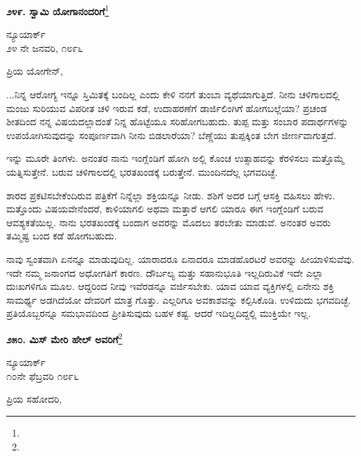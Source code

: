 \begin{center}
\textbf{೨೪೯. ಸ್ವಾಮಿ ಯೋಗಾನಂದರಿಗೆ}\footnote{}
\end{center}

\vspace{-0.5cm}

\begin{flushright}
ನ್ಯೂಯಾರ್ಕ್\\೨೪ ನೇ ಜನವರಿ, ೧೮೯೬
\end{flushright}

\vspace{-0.5cm}

\noindent
ಪ್ರಿಯ ಯೋಗೇನ್,

...ನಿನ್ನ ಆರೋಗ್ಯ ಇನ್ನೂ ಸ್ತಿಮಿತಕ್ಕೆ ಬಂದಿಲ್ಲ ಎಂದು ಕೇಳಿ ನನಗೆ ತುಂಬಾ ವ್ಯಥೆಯಾಗುತ್ತಿದೆ. ನೀನು ಚಳಿಗಾಲದಲ್ಲಿ ಮಂಜು ಸುರಿಯುವ ವಿಪರೀತ ಚಳಿ ಇರುವ ಕಡೆ, ಉದಾಹರಣೆಗೆ ಡಾರ್ಜಿಲಿಂಗಿಗೆ ಹೋಗಬಲ್ಲೆಯಾ? ಪ್ರಚಂಡ ಶೀತದಿಂದ ನನ್ನ ವಿಷಯದಲ್ಲಾದಂತೆ ನಿನ್ನ ಹೊಟ್ಟೆಯೂ ಸರಿಹೋಗಬಹುದು. ತುಪ್ಪ ಮತ್ತು ಸಂಬಾರ ಪದಾರ್ಥಗಳನ್ನು ಉಪಯೋಗಿಸುವುದನ್ನು ಸಂಪೂರ್ಣವಾಗಿ ನೀನು ಬಿಡಲಾರೆಯಾ? ಬೆಣ್ಣೆಯು ತುಪ್ಪಕ್ಕಿಂತ ಬೇಗ ಜೀರ್ಣವಾಗುತ್ತದೆ.

ಇನ್ನು ಮೂರೇ ತಿಂಗಳು. ಅನಂತರ ನಾನು ಇಂಗ್ಲೆಂಡಿಗೆ ಹೋಗಿ ಅಲ್ಲಿ ಕೊಂಚ ಉತ್ಸಾಹವನ್ನು ಕೆರಳಿಸಲು ಮತ್ತೊಮ್ಮೆ ಯತ್ನಿಸುತ್ತೇನೆ. ಬರುವ ಚಳಿಗಾಲದಲ್ಲಿ ಭರತಖಂಡಕ್ಕೆ ಬರುತ್ತೇನೆ. ಮುಂದಿನದೆಲ್ಲ ಭಗವದಿಚ್ಛೆ.

ಶಾರದ ಪ್ರಕಟಿಸಬೇಕೆಂದಿರುವ ಪತ್ರಿಕೆಗೆ ನಿನ್ನೆಲ್ಲಾ ಶಕ್ತಿಯನ್ನೂ ನೀಡು. ಶಶಿಗೆ ಅದರ ಬಗ್ಗೆ ಆಸಕ್ತಿ ವಹಿಸಲು ಹೇಳು. ಮತ್ತೊಂದು ವಿಷಯವೇನೆಂದರೆ, ಕಾಳಿಯಾಗಲಿ ಅಥವಾ ಮತ್ತಾರೆ ಆಗಲಿ ಯಾರೂ ಈಗ ಇಂಗ್ಲೆಂಡಿಗೆ ಬರುವ ಆವಶ್ಯಕತೆಯಿಲ್ಲ. ನಾನು ಭರತಖಂಡಕ್ಕೆ ಬಂದಾಗ ಅವರನ್ನು ಮೊದಲು ತರಬೇತು ಮಾಡುವೆ. ಅನಂತರ ಅವರು ತಮ್ಮಿಷ್ಟ ಬಂದ ಕಡೆ ಹೋಗಬಹುದು.

ನಾವು ಸ್ವಂತವಾಗಿ ಏನನ್ನೂ ಮಾಡುವುದಿಲ್ಲ. ಯಾರಾದರೂ ಏನಾದರೂ ಮಾಡಹೊರಟರೆ ಅವರನ್ನು ಹೀಯಾಳಿಸುವೆವು. ಇದೇ ನಮ್ಮ ಜನಾಂಗದ ಅಧೋಗತಿಗೆ ಕಾರಣ. ದೌರ್ಬಲ್ಯ ಮತ್ತು ಸಹಾನುಭೂತಿ ಇಲ್ಲದಿರುವಿಕೆ ಇದೇ ಎಲ್ಲಾ ದುಃಖಗಳಿಗೂ ಮೂಲ. ಆದ್ದರಿಂದ ನೀವು ಇವೆರಡನ್ನೂ ವರ್ಜಿಸಬೇಕು. ಯಾವ ಯಾವ ವ್ಯಕ್ತಿಗಳಲ್ಲಿ ಏನೇನು ಶಕ್ತಿ ಸಾಮರ್ಥ್ಯ ಅಡಗಿದೆಯೋ ದೇವರಿಗೆ ಮಾತ್ರ ಗೊತ್ತು. ಎಲ್ಲರಿಗೂ ಅವಕಾಶವನ್ನು ಕಲ್ಪಿಸಿಕೊಡಿ. ಉಳಿದುದು ಭಗವದಿಚ್ಛೆ. ಪ್ರತಿಯೊಬ್ಬರನ್ನೂ ಸಮಭಾವದಿಂದ ಪ್ರೀತಿಸುವುದು ಬಹಳ ಕಷ್ಟ. ಆದರೆ ಇದಿಲ್ಲದಿದ್ದಲ್ಲಿ ಮುಕ್ತಿಯೇ ಇಲ್ಲ.




\begin{center}
\textbf{೨೫೦. ಮಿಸ್ ಮೇರಿ ಹೇಲ್ ಅವರಿಗೆ}\footnote{}
\end{center}

\begin{flushright}
ನ್ಯೂಯಾರ್ಕ್\\೧೦ನೇ ಫೆಬ್ರವರಿ ೧೮೯೬
\end{flushright}

\noindent
ಪ್ರಿಯ ಸಹೋದರಿ,

